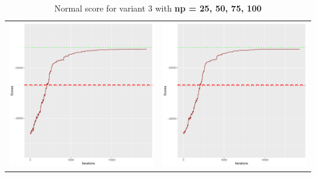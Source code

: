 \documentclass[]{scrartcl}
\begin{document}
\begin{table}[h!]
\begin{tabular}{cc}
\includegraphics[scale = 0.4]{./figs/win95pts/v3/75/boundsEvolution-14252.pdf} & 
\includegraphics[scale = 0.4]{./figs/win95pts/v3/100/boundsEvolution-14252.pdf} \\
\end{tabular}
\caption{Normal score for variant 3 with \textbf{np =  25, 50, 75, 100}}
\end{table}
\end{document}
